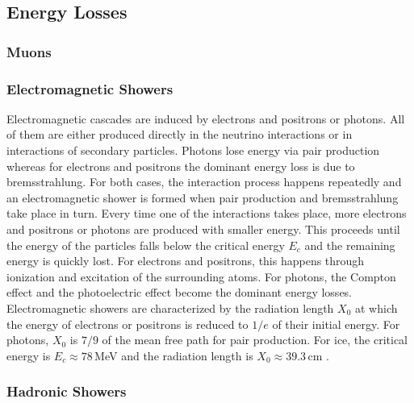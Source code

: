 \subsection{Energy Losses} 


\subsubsection{Muons}


\subsubsection{Electromagnetic Showers}

Electromagnetic cascades are induced by electrons and positrons or photons.
All of them are either produced directly in the neutrino interactions or in interactions of secondary particles.
Photons lose energy via pair production whereas for electrons and positrons the dominant energy loss is due to bremsstrahlung.
For both cases, the interaction process happens repeatedly and an electromagnetic shower is formed when pair production and bremsstrahlung take place in turn.
Every time one of the interactions takes place, more electrons and positrons or photons are produced with smaller energy. 
This proceeds until the energy of the particles falls below the critical energy $E_c$ and the remaining energy is quickly lost.
For electrons and positrons, this happens through ionization and excitation of the surrounding atoms.
For photons, the Compton effect and the photoelectric effect become the dominant energy losses.
Electromagnetic showers are characterized by the radiation length $X_0$ at which the energy of electrons or positrons is reduced to $1/e$ of their initial energy.
For photons, $X_0$ is $7/9$ of the mean free path for pair production. For ice, the critical energy is $E_c \approx 78$\,MeV and the radiation length is $X_0 \approx 39.3$\,cm .


\subsubsection{Hadronic Showers}

